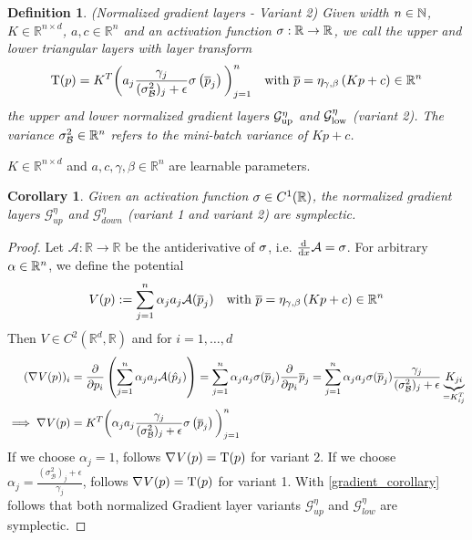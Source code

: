 \documentclass[twoside,a4paper]{article}
\newtheorem{definition}{Definition}
\newtheorem{corollary}{Corollary}
\begin{document}
\begin{definition}\label{def_norm_gradient_layers_2}
	(Normalized gradient layers - Variant 2)
	Given width $n \in \mathbb{N}$, $K \in \mathbb{R}^{n \times d}$, $a,c \in \mathbb{R}^n$ and
	an activation function $\sigma : \mathbb{R} \to \mathbb{R}$,
	we call the upper and lower triangular layers with layer transform
	\begin{equation*}
		\mathrm{T}(p) = K^T \bigg( a_j \frac{\gamma_j}{(\sigma^2_\mathcal{B})_j + \epsilon}
		\sigma \left( \overline{p}_j \right) \bigg)_{j=1}^n
		\quad \text{with } \overline{p} = \eta_{\gamma, \beta} \left( Kp + c \right) \in \mathbb{R}^n
	\end{equation*}
	the upper and lower normalized gradient layers 
	$\mathcal{G}_{\text{up}}^{\eta}$ and $\mathcal{G}_{\text{low}}^{\eta}$ (variant 2).
	The variance $\sigma^2_\mathcal{B} \in \mathbb{R}^n$ refers to the mini-batch variance of $Kp+c$.
\end{definition}

$K \in \mathbb{R}^{n \times d}$ and $a,c, \gamma, \beta \in \mathbb{R}^n$
are learnable parameters.


\begin{corollary}\label{cor_norm_gradient_layers_symp}
	Given an activation function $\sigma \in C^1(\mathbb{R})$,
	the normalized gradient layers $\mathcal{G}^{\eta}_{up}$ and $\mathcal{G}^{\eta}_{down}$
	(variant 1 and variant 2) are symplectic.
\end{corollary}
\begin{proof}
	Let $\mathcal{A}: \mathbb{R} \to \mathbb{R}$ be the antiderivative of $\sigma$, 
	i.e. $\frac{\mathrm{d}^{}}{\mathrm{d}x} \mathcal{A} = \sigma$. For arbitrary $\alpha \in \mathbb{R}^n$, we define the potential
	\begin{equation*}
		V(p) := \sum_{j=1}^n \alpha_j a_j \mathcal{A}(\overline{p}_j)
		\quad \text{with } \overline{p} = \eta_{\gamma, \beta} \left( Kp + c \right) \in \mathbb{R}^n
	\end{equation*}
	Then $V \in C^2(\mathbb{R}^d, \mathbb{R})$ and for $i=1, \dots, d$
	\begin{align*}
		(\nabla_{}{V(p)})_i &= \frac{\partial }{\partial p_i} \left( \sum_{j=1}^n \alpha_j a_j \mathcal{A}(\hat{p}_j) \right)
		= \sum_{j=1}^n \alpha_j a_j \sigma(\overline{p}_j) \frac{\partial }{\partial p_i} \overline{p}_j
		= \sum_{j=1}^n \alpha_j a_j \sigma(\overline{p}_j)
		\frac{\gamma_j}{(\sigma^2_\mathcal{B})_j + \epsilon} \underbrace{K_{ji}}_{=K^T_{ij}} \\
		\implies
		\nabla_{}{V(p)}
		&= K^T \bigg( \alpha_j a_j \frac{\gamma_j}{(\sigma^2_\mathcal{B})_j + \epsilon}
		\sigma \left( \overline{p}_j \right) \bigg)_{j=1}^n
	\end{align*}
	If we choose $\alpha_j = 1$, follows $\nabla_{}{V(p)} = \mathrm{T}(p)$ for variant 2.
	If we choose $\alpha_j = \frac{(\sigma^2_\mathcal{B})_j + \epsilon}{\gamma_j}$,
	follows $\nabla_{}{V(p)} = \mathrm{T}(p)$ for variant 1.
	With \cref{gradient_corollary} follows that both normalized Gradient layer variants
	$\mathcal{G}_{up}^\eta$ and $\mathcal{G}_{low}^\eta$ are symplectic.
\end{proof}
\end{document}
